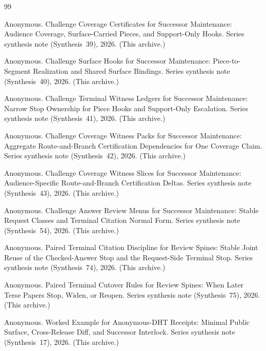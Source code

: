 \documentclass[11pt]{article}
\begin{document}
\begin{thebibliography}{99}\small

Anonymous.
\newblock Challenge Coverage Certificates for Successor Maintenance: Audience Coverage, Surface-Carried Pieces, and Support-Only Hooks.
\newblock Series synthesis note (Synthesis~39), 2026. (This archive.)

Anonymous.
\newblock Challenge Surface Hooks for Successor Maintenance: Piece-to-Segment Realization and Shared Surface Bindings.
\newblock Series synthesis note (Synthesis~40), 2026. (This archive.)

Anonymous.
\newblock Challenge Terminal Witness Ledgers for Successor Maintenance: Narrow Stop Ownership for Piece Hooks and Support-Only Escalation.
\newblock Series synthesis note (Synthesis~41), 2026. (This archive.)

Anonymous.
\newblock Challenge Coverage Witness Packs for Successor Maintenance: Aggregate Route-and-Branch Certification Dependencies for One Coverage Claim.
\newblock Series synthesis note (Synthesis~42), 2026. (This archive.)

Anonymous.
\newblock Challenge Coverage Witness Slices for Successor Maintenance: Audience-Specific Route-and-Branch Certification Deltas.
\newblock Series synthesis note (Synthesis~43), 2026. (This archive.)

Anonymous.
\newblock Challenge Answer Review Menus for Successor Maintenance: Stable Request Classes and Terminal Citation Normal Form.
\newblock Series synthesis note (Synthesis~54), 2026. (This archive.)

Anonymous.
\newblock Paired Terminal Citation Discipline for Review Spines: Stable Joint Reuse of the Checked-Answer Stop and the Request-Side Terminal Stop.
\newblock Series synthesis note (Synthesis~74), 2026. (This archive.)

Anonymous.
\newblock Paired Terminal Cutover Rules for Review Spines: When Later Terse Papers Stop, Widen, or Reopen.
\newblock Series synthesis note (Synthesis~75), 2026. (This archive.)

Anonymous.
\newblock Worked Example for Anonymous-DHT Receipts: Minimal Public Surface, Cross-Release Diff, and Successor Interlock.
\newblock Series synthesis note (Synthesis~17), 2026. (This archive.)

\end{thebibliography}
\end{document}
